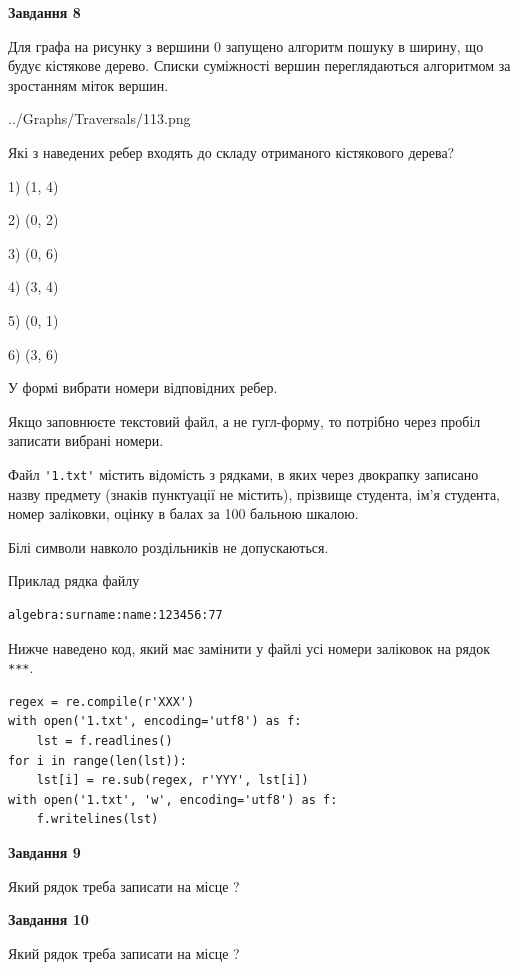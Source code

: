\documentclass[12pt, ukrainian]{article}
\def\code#1{\Verb!#1!}
\begin{document}
{\begin {large}
{\begin {center}\textbf{Завдання 8}\end {center}}\par
Для графа на рисунку з вершини 0 запущено алгоритм пошуку в ширину, що будує кістякове дерево. Списки суміжності вершин переглядаються алгоритмом за зростанням міток вершин.\par
\begin{center}
	{../Graphs/Traversals/113.png}
\end{center}
\par Які з наведених ребер входять до складу отриманого кістякового дерева?\par
1) (1, 4)\par
2) (0, 2)\par
3) (0, 6)\par
4) (3, 4)\par
5) (0, 1)\par
6) (3, 6)\par
{\vskip 15pt} У формі вибрати номери відповідних ребер.


Якщо заповнюєте текстовий файл, а не гугл-форму, то потрібно через пробіл записа\-ти вибрані номери.\par
\newpage


Файл \code{'1.txt'} містить відомість з рядками, в яких через двокрапку записа\-но назву предмету (знаків пунктуації не містить), прізвище студента, ім'я студента, номер залі\-ков\-ки, оцінку в балах за 100 бальною шкалою.

Білі символи навколо роздільників не допускаються.

Приклад рядка файлу



\begin{verbatim}
algebra:surname:name:123456:77
\end{verbatim}


Нижче наведено код, який має замінити у файлі усі номери заліковок на рядок \code{***}.



\begin{verbatim}
regex = re.compile(r'XXX')
with open('1.txt', encoding='utf8') as f:
    lst = f.readlines()
for i in range(len(lst)):
    lst[i] = re.sub(regex, r'YYY', lst[i])
with open('1.txt', 'w', encoding='utf8') as f:
    f.writelines(lst)
\end{verbatim}




{\begin {center}\textbf{Завдання 9}\end {center}}\par
Який рядок треба записати на місце  ?\par
\vspace{5mm}


{\begin {center}\textbf{Завдання 10}\end {center}}\par
Який рядок треба записати на місце  ?\par


\newpage


\end {large}}
\end{document}
